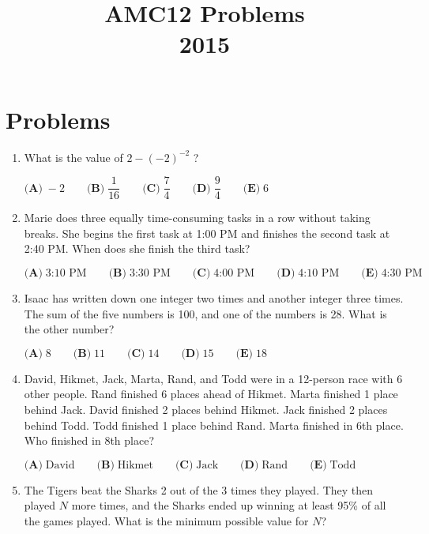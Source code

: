 \documentclass{article}
\title{AMC12 Problems \\ 2015}
\date{}
\begin{document}
\maketitle\thispagestyle{fancy}\newpage\section*{Problems}\begin{enumerate}[label=\arabic*., itemsep=0.5em]\item What is the value of $2-(-2)^{-2}$ ?

$\textbf{(A)}\; -2 \qquad\textbf{(B)}\; \dfrac{1}{16} \qquad\textbf{(C)}\; \dfrac{7}{4} \qquad\textbf{(D)}\; \dfrac{9}{4} \qquad\textbf{(E)}\; 6$\par \vspace{0.5em}\item Marie does three equally time-consuming tasks in a row without taking breaks. She begins the first task at 1:00 PM and finishes the second task at 2:40 PM. When does she finish the third task?

$\textbf{(A)}\; \text{3:10 PM} \qquad\textbf{(B)}\; \text{3:30 PM} \qquad\textbf{(C)}\; \text{4:00 PM} \qquad\textbf{(D)}\; \text{4:10 PM} \qquad\textbf{(E)}\; \text{4:30 PM}$\par \vspace{0.5em}\item Isaac has written down one integer two times and another integer three times. The sum of the five numbers is 100, and one of the numbers is 28. What is the other number?

$\textbf{(A)}\; 8 \qquad\textbf{(B)}\; 11 \qquad\textbf{(C)}\; 14 \qquad\textbf{(D)}\; 15 \qquad\textbf{(E)}\; 18$\par \vspace{0.5em}\item David, Hikmet, Jack, Marta, Rand, and Todd were in a 12-person race with 6 other people. Rand finished 6 places ahead of Hikmet. Marta finished 1 place behind Jack. David finished 2 places behind Hikmet. Jack finished 2 places behind Todd. Todd finished 1 place behind Rand. Marta finished in 6th place. Who finished in 8th place?

$\textbf{(A)}\; \text{David} \qquad\textbf{(B)}\; \text{Hikmet} \qquad\textbf{(C)}\; \text{Jack} \qquad\textbf{(D)}\; \text{Rand} \qquad\textbf{(E)}\; \text{Todd}$\par \vspace{0.5em}\item The Tigers beat the Sharks 2 out of the 3 times they played. They then played $N$ more times, and the Sharks ended up winning at least 95\% of all the games played. What is the minimum possible value for $N$?


\end{enumerate}
\end{document}
